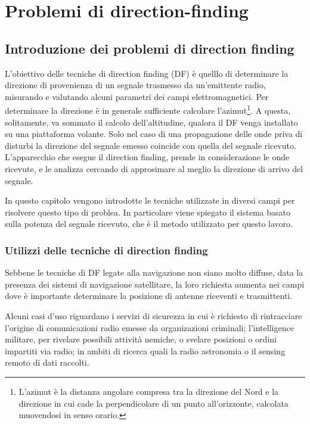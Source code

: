 \chapter{Problemi di direction-finding}
\section{Introduzione dei problemi di direction finding}

L'obiettivo delle tecniche di direction finding (DF) è quelllo di determinare la direzione di provenienza di un segnale trasmesso da un'emittente radio, misurando e valutando alcuni parametri dei campi elettromagnetici. Per determinare la direzione è in generale sufficiente calcolare l'azimut\footnote{L'azimut è la distanza angolare compresa tra la direzione del Nord e la direzione in cui cade la perpendicolare di un punto all'orizzonte, calcolata muovendosi in senso orario.}. A questa, solitamente, va sommato il calcolo dell'altitudine, qualora il DF venga installato su una piattaforma volante. Solo nel caso di una propagazione delle onde priva di disturbi la direzione del segnale emesso coincide con quella del segnale ricevuto. L'apparecchio che esegue il direction finding, prende in considerazione le onde ricevute, e le analizza cercando di approsimare al meglio la direzione di arrivo del segnale.

In questo capitolo vengono introdotte le tecniche utilizzate in diversi campi per risolvere questo tipo di problea. In particolare viene spiegato il sistema basato sulla potenza del segnale ricevuto, che è il metodo utilizzato per questo lavoro. 

\subsection{Utilizzi delle tecniche di direction finding}
Sebbene le tecniche di DF legate alla navigazione non siano molto diffuse, data la presenza dei sistemi di navigazione satellitare, la loro richiesta aumenta nei campi dove è importante determinare la posizione di antenne riceventi e trasmittenti. 

Alcuni casi d'uso riguardano i servizi di sicurezza in cui è richiesto di rintracciare l'origine di comunicazioni radio emesse da organizazioni criminali; l'intelligence militare, per rivelare possibili attività nemiche, o svelare posizioni o ordini impartiti via radio; in ambiti di ricerca quali la radio astronomia o il sensing remoto di dati raccolti. 

